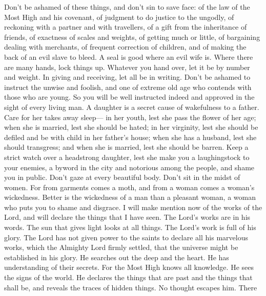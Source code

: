  Don't be ashamed of these things, and don't sin to save
face:  of the law of the Most High and his covenant, of
judgment to do justice to the ungodly,  of reckoning with
a partner and with travellers, of a gift from the inheritance of
friends,  of exactness of scales and weights, of getting
much or little,  of bargaining dealing with merchants, of
frequent correction of children, and of making the back of an evil slave
to bleed.  A seal is good where an evil wife is. Where
there are many hands, lock things up.  Whatever you hand
over, let it be by number and weight. In giving and receiving, let all
be in writing.  Don't be ashamed to instruct the unwise
and foolish, and one of extreme old age who contends with those who are
young. So you will be well instructed indeed and approved in the sight
of every living man.  A daughter is a secret cause of
wakefulness to a father. Care for her takes away sleep--- in her youth,
lest she pass the flower of her age; when she is married, lest she
should be hated;  in her virginity, lest she should be
defiled and be with child in her father's house; when she has a husband,
lest she should transgress; and when she is married, lest she should be
barren.  Keep a strict watch over a headstrong daughter,
lest she make you a laughingstock to your enemies, a byword in the city
and notorious among the people, and shame you in public. 
Don't gaze at every beautiful body. Don't sit in the midst of women.
 For from garments comes a moth, and from a woman comes a
woman's wickedness.  Better is the wickedness of a man
than a pleasant woman, a woman who puts you to shame and disgrace.
 I will make mention now of the works of the Lord, and
will declare the things that I have seen. The Lord's works are in his
words.  The sun that gives light looks at all things. The
Lord's work is full of his glory.  The Lord has not given
power to the saints to declare all his marvelous works, which the
Almighty Lord firmly settled, that the universe might be established in
his glory.  He searches out the deep and the heart. He
has understanding of their secrets. For the Most High knows all
knowledge. He sees the signs of the world.  He declares
the things that are past and the things that shall be, and reveals the
traces of hidden things.  No thought escapes him. There
